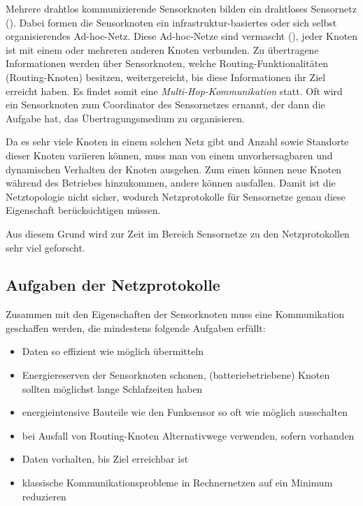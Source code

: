 	Mehrere drahtlos kommunizierende Sensorknoten bilden ein drahtloses
	Sensornetz ().  Dabei formen die
	Sensorknoten ein infrastruktur-basiertes oder sich selbst
	organisierendes Ad-hoc-Netz.  Diese Ad-hoc-Netze sind vermascht
	(), \dhx jeder Knoten ist mit einem oder mehreren anderen
	Knoten verbunden. Zu übertragene Informationen werden über
	Sensorknoten, welche Routing-Funktionalitäten (Routing-Knoten)
	besitzen, weitergereicht, bis diese Informationen ihr Ziel erreicht
	haben.  Es findet somit eine \emph{Multi-Hop-Kommunikation} statt.  Oft
	wird ein Sensorknoten zum Coordinator des Sensornetzes ernannt, der
	dann die Aufgabe hat, das Übertragungsmedium zu organisieren.

	Da es sehr viele Knoten in einem solchen Netz gibt und Anzahl sowie
	Standorte dieser Knoten variieren können, muss man von einem
	unvorhersagbaren und dynamischen Verhalten der Knoten ausgehen. Zum
	einen können neue Knoten während des Betriebes hinzukommen, andere
	können ausfallen.  Damit ist die Netztopologie nicht sicher, wodurch
	Netzprotokolle für Sensornetze genau diese Eigenschaft berücksichtigen
	müssen.

	Aus diesem Grund wird zur Zeit im Bereich Sensornetze zu den
	Netzprotokollen sehr viel geforscht.

\subsection{Aufgaben der Netzprotokolle}
\label{sec:AufgabenNetzprotokolle}

	Zusammen mit den Eigenschaften der Sensorknoten muss eine Kommunikation
	geschaffen werden, die mindestens folgende Aufgaben erfüllt:

	\begin{itemize}
	\item 	Daten so effizient wie möglich übermitteln
	\item 	Energiereserven der Sensorknoten schonen, \dhx
		(batteriebetriebene) Knoten sollten möglichst lange
		Schlafzeiten haben
	\item 	energieintensive Bauteile wie den Funksensor so oft wie
		möglich ausschalten
	\item 	bei Ausfall von Routing-Knoten Alternativwege verwenden,
		sofern vorhanden
	\item 	Daten vorhalten, bis Ziel erreichbar ist
	\item 	klassische Kommunikationsprobleme in Rechnernetzen
		auf ein Minimum reduzieren
	\end{itemize}

